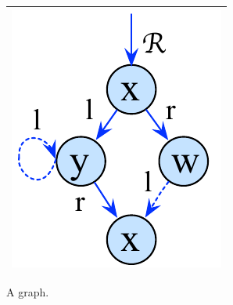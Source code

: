 \begin{figure}
	\centering
	\begin{tabular}{|c |}
		\hline
			\includegraphics[scale=0.27]{Sections/FurtherExamples/Images/graph.pdf} \\
		\hline
	\end{tabular}
\caption{A graph.}
\label{fig:graphAndTree}
\end{figure}

